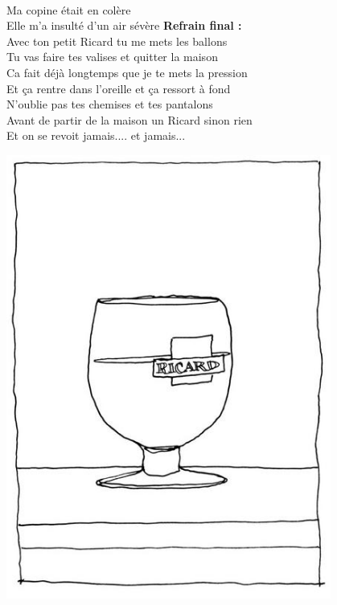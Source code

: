 \\Ma copine était en colère
\\Elle m'a insulté d'un air sévère
\breakpage
\textbf{Refrain final :}
\\Avec ton petit Ricard tu me mets les ballons
\\Tu vas faire tes valises et quitter la maison
\\Ca fait déjà longtemps que je te mets la pression
\\Et ça rentre dans l'oreille et ça ressort à fond
\\N'oublie pas tes chemises et tes pantalons
\\Avant de partir de la maison un Ricard sinon rien
\\Et on se revoit jamais.... et jamais...
\\
\begin{center}
\includegraphics[width=0.8\textwidth]{images/Ricard.jpg}
\end{center}

\breakpage